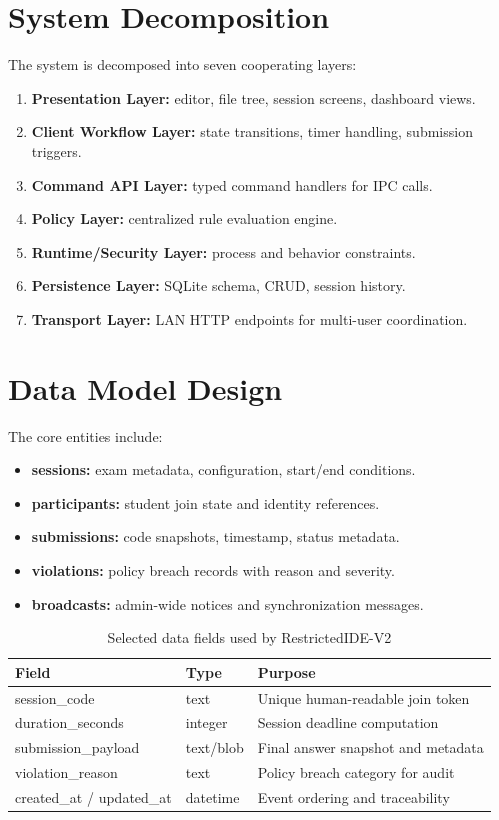 \documentclass[12pt,a4paper]{report}
\begin{document}
	\section{System Decomposition}
	The system is decomposed into seven cooperating layers:
	\begin{enumerate}
		\item \textbf{Presentation Layer:} editor, file tree, session screens, dashboard views.
		\item \textbf{Client Workflow Layer:} state transitions, timer handling, submission triggers.
		\item \textbf{Command API Layer:} typed command handlers for IPC calls.
		\item \textbf{Policy Layer:} centralized rule evaluation engine.
		\item \textbf{Runtime/Security Layer:} process and behavior constraints.
		\item \textbf{Persistence Layer:} SQLite schema, CRUD, session history.
		\item \textbf{Transport Layer:} LAN HTTP endpoints for multi-user coordination.
	\end{enumerate}
	
	\section{Data Model Design}
	The core entities include:
	\begin{itemize}
		\item \textbf{sessions:} exam metadata, configuration, start/end conditions.
		\item \textbf{participants:} student join state and identity references.
		\item \textbf{submissions:} code snapshots, timestamp, status metadata.
		\item \textbf{violations:} policy breach records with reason and severity.
		\item \textbf{broadcasts:} admin-wide notices and synchronization messages.
	\end{itemize}
	
	\begin{table}[htbp]
		\centering
		\caption{Selected data fields used by RestrictedIDE-V2}
		\begin{tabular}{|p{}|p{}|p{}|}
			\hline
			\textbf{Field} & \textbf{Type} & \textbf{Purpose} \\
			\hline
			session\_code & text & Unique human-readable join token \\
			\hline
			duration\_seconds & integer & Session deadline computation \\
			\hline
			submission\_payload & text/blob & Final answer snapshot and metadata \\
			\hline
			violation\_reason & text & Policy breach category for audit \\
			\hline
			created\_at / updated\_at & datetime & Event ordering and traceability \\
			\hline
		\end{tabular}
	\end{table}
	
\end{document}
